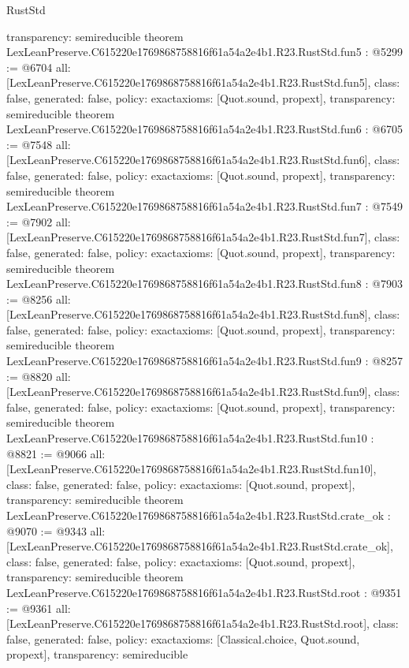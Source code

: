 \begin{lexlean}{RustStd}
\begin{coremodule}
{  transparency: semireducible
}
theorem LexLeanPreserve.C615220e1769868758816f61a54a2e4b1.R23.RustStd.fun5 : @5299 := @6704 {
  all: [LexLeanPreserve.C615220e1769868758816f61a54a2e4b1.R23.RustStd.fun5],
  class: false,
  generated: false,
  policy: exact{axioms: [Quot.sound, propext]},
  transparency: semireducible
}
theorem LexLeanPreserve.C615220e1769868758816f61a54a2e4b1.R23.RustStd.fun6 : @6705 := @7548 {
  all: [LexLeanPreserve.C615220e1769868758816f61a54a2e4b1.R23.RustStd.fun6],
  class: false,
  generated: false,
  policy: exact{axioms: [Quot.sound, propext]},
  transparency: semireducible
}
theorem LexLeanPreserve.C615220e1769868758816f61a54a2e4b1.R23.RustStd.fun7 : @7549 := @7902 {
  all: [LexLeanPreserve.C615220e1769868758816f61a54a2e4b1.R23.RustStd.fun7],
  class: false,
  generated: false,
  policy: exact{axioms: [Quot.sound, propext]},
  transparency: semireducible
}
theorem LexLeanPreserve.C615220e1769868758816f61a54a2e4b1.R23.RustStd.fun8 : @7903 := @8256 {
  all: [LexLeanPreserve.C615220e1769868758816f61a54a2e4b1.R23.RustStd.fun8],
  class: false,
  generated: false,
  policy: exact{axioms: [Quot.sound, propext]},
  transparency: semireducible
}
theorem LexLeanPreserve.C615220e1769868758816f61a54a2e4b1.R23.RustStd.fun9 : @8257 := @8820 {
  all: [LexLeanPreserve.C615220e1769868758816f61a54a2e4b1.R23.RustStd.fun9],
  class: false,
  generated: false,
  policy: exact{axioms: [Quot.sound, propext]},
  transparency: semireducible
}
theorem LexLeanPreserve.C615220e1769868758816f61a54a2e4b1.R23.RustStd.fun10 : @8821 := @9066 {
  all: [LexLeanPreserve.C615220e1769868758816f61a54a2e4b1.R23.RustStd.fun10],
  class: false,
  generated: false,
  policy: exact{axioms: [Quot.sound, propext]},
  transparency: semireducible
}
theorem LexLeanPreserve.C615220e1769868758816f61a54a2e4b1.R23.RustStd.crate_ok : @9070 := @9343 {
  all: [LexLeanPreserve.C615220e1769868758816f61a54a2e4b1.R23.RustStd.crate_ok],
  class: false,
  generated: false,
  policy: exact{axioms: [Quot.sound, propext]},
  transparency: semireducible
}
theorem LexLeanPreserve.C615220e1769868758816f61a54a2e4b1.R23.RustStd.root : @9351 := @9361 {
  all: [LexLeanPreserve.C615220e1769868758816f61a54a2e4b1.R23.RustStd.root],
  class: false,
  generated: false,
  policy: exact{axioms: [Classical.choice, Quot.sound, propext]},
  transparency: semireducible
}


\end{coremodule}
\end{lexlean}

